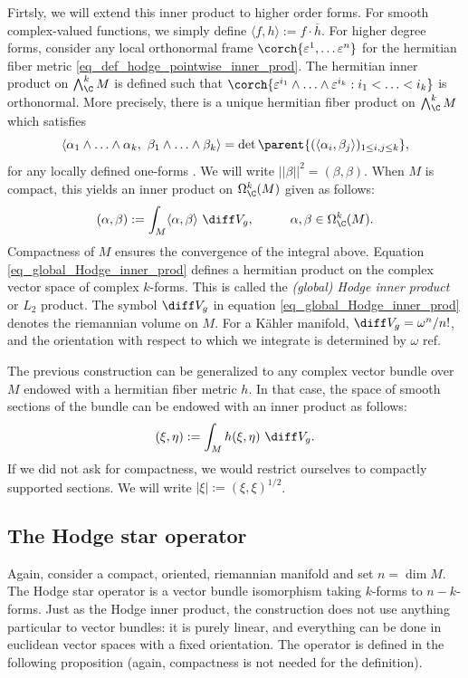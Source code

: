 Firtsly, we will extend this inner product to higher order forms. For smooth complex-valued functions, we simply define \(\langle f,h \rangle := f\cdot \overline{h}\). For higher degree forms, consider any local orthonormal frame \(\corch{\varepsilon^1, \ldots \varepsilon^n}\) for the hermitian fiber metric \eqref{eq_def_hodge_pointwise_inner_prod}. The hermitian inner product on \(\bigwedge_\C^k M\) is defined such that \(\corch{\varepsilon^{i_1} \wedge \ldots \wedge \varepsilon^{i_k}: i_1 < \ldots < i_k}\) is orthonormal. More precisely, there is a unique hermitian fiber product on \(\bigwedge^k_\C M\) which satisfies
\[
\langle \alpha_1 \wedge \ldots \wedge \alpha_k, \ \beta_1 \wedge \ldots \wedge \beta_k \rangle =\det \parent{(\langle \alpha_i, \beta_j \rangle)_{1 \leq i,j \leq k}},
\]
for any locally defined one-forms \parencite[Lemma 9.1]{lee_introCM}. We will write \(||\beta||^2=(\beta, \beta)\). When \(M\) is compact, this yields an inner product on \(\Omega_\C^k(M)\) given as follows:
\begin{equation} \label{eq_global_Hodge_inner_prod}
    (\alpha, \beta):=\int_M \langle \alpha, \beta \rangle \ \diff V_g, \hspace{1 cm} \alpha, \beta \in \Omega_\C^k(M).
\end{equation} 
Compactness of \(M\) ensures the convergence of the integral above. Equation \eqref{eq_global_Hodge_inner_prod} defines a hermitian product on the complex vector space of complex \(k\)-forms. This is called the \textit{(global) Hodge inner product} or \(L_2\) product. The symbol \(\diff V_g\) in equation \eqref{eq_global_Hodge_inner_prod} denotes the riemannian volume on \(M\). For a Kähler manifold, \(\diff V_g=\omega^n/n!\), and the orientation with respect to which we integrate is determined by \(\omega\) {\color{red}ref}.

\begin{obs} \label{def_prod_vect_bund}
    The previous construction can be generalized to any complex vector bundle over \(M\) endowed with a hermitian fiber metric \(h\). In that case, the space of smooth sections of the bundle can be endowed with an inner product as follows:
    \[
    (\xi, \eta):=\int_M h(\xi, \eta) \ \diff V_g.
    \]
    If we did not ask for compactness, we would restrict ourselves to compactly supported sections. We will write \(|\xi|:=(\xi, \xi)^{1/2}\).
\end{obs}

\subsection{The Hodge star operator}
Again, consider a compact, oriented, riemannian manifold and set \(n=\dim M\). The Hodge star operator is a vector bundle isomorphism taking 
\(k\)-forms to \(n-k\)-forms. Just as the Hodge inner product, the construction does not use anything particular to vector bundles: it is purely linear, and everything can be done in euclidean vector spaces with a fixed orientation. The operator is defined in the following proposition (again, compactness is not needed for the definition).

